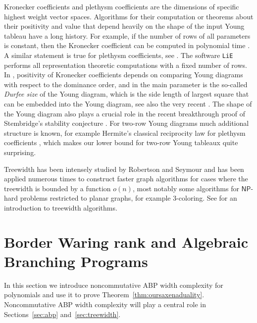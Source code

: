 \documentclass[10pt,a4paper]{article}
\numberwithin{equation}{section}
\theoremstyle{definition}
\newcommand{\NP}{\ensuremath{\mathsf{NP}}}
\begin{document}
Kronecker coefficients and plethysm coefficients are the dimensions of specific highest weight vector spaces.
Algorithms for their computation or theorems about their positivity and value that depend heavily on the shape of the input Young tableau have a long history.
For example, if the number of rows of all parameters is constant, then the Kronecker coefficient can be computed in polynomial time \cite{CDW:12}.
A similar statement is true for plethysm coefficients, see \cite{FI:20}.
The software \texttt{LiE} \cite{LiE} performs all representation theoretic computations with a fixed number of rows.
In \cite{Ike:15}, positivity of Kronecker coefficients depends on comparing Young diagrams with respect to the dominance order, and in \cite{BB:04} the main parameter is the so-called \emph{Durfee size} of the Young diagram, which is the side length of largest square that can be embedded into the Young diagram, see also the very recent \cite{BBP:20}.
The shape of the Young diagram also plays a crucial role in the recent breakthrough proof of Stembridge's stability conjecture \cite{SS:16}.
For two-row Young diagrams much additional structure is known, for example Hermite's classical reciprocity law for plethysm coefficients \cite{Her:54}, which makes our lower bound for two-row Young tableaux quite surprising.

Treewidth has been intensely studied by Robertson and Seymour and has been applied numerous times to construct faster graph algorithms for cases where the treewidth is bounded by a function $o(n)$, most notably some algorithms for $\NP$-hard problems restricted to planar graphs, for example $3$-coloring.
See \cite{cygan2015parameterized} for an introduction to treewidth algorithms.






\section{Border Waring rank and Algebraic Branching Programs}\label{sec:prelude}
In this section we introduce noncommutative ABP width complexity for polynomials and use it to prove Theorem~\ref{thm:oursaxenaduality}.
Noncommutative ABP width complexity will play a central role in Sections~\ref{sec:abp} and~\ref{sec:treewidth}.
\end{document}
